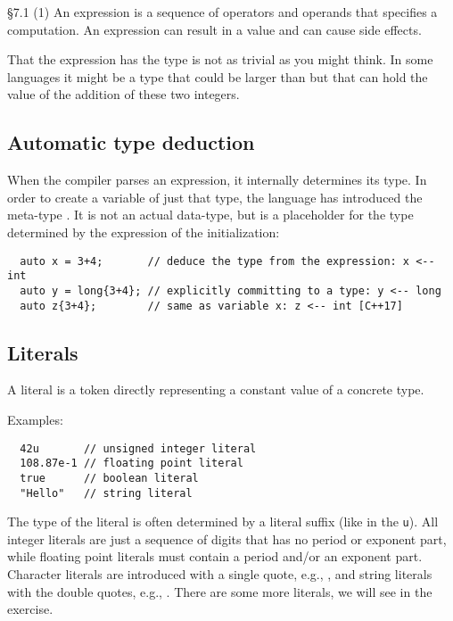\begin{standard}{\S 7.1 (1)}
  An expression is a sequence of operators and operands that specifies a computation. An expression can result in a value and can cause side effects.
\end{standard}

\begin{rem}
  That the expression  has the type  is not as trivial as you might think. In some languages it might be a type that could be larger than  but that can hold the value of the addition of these two integers.
\end{rem}


\subsection{Automatic type deduction}
When the compiler parses an expression, it internally determines its type. In order to create a variable of just that type, the language has introduced the meta-type . It is not an actual data-type, but is a placeholder for the type determined by the expression of the
initialization:
%
\begin{verbatim}
  auto x = 3+4;       // deduce the type from the expression: x <-- int
  auto y = long{3+4}; // explicitly committing to a type: y <-- long
  auto z{3+4};        // same as variable x: z <-- int [C++17]
\end{verbatim}

\subsection{Literals\label{sec:literal}}
A literal is a token directly representing a constant value of a concrete type.

Examples:
\begin{verbatim}
  42u       // unsigned integer literal
  108.87e-1 // floating point literal
  true      // boolean literal
  "Hello"   // string literal
\end{verbatim}

The type of the literal is often determined by a literal suffix (like in  the \texttt{u}). All integer literals are just a sequence of digits that has no period or exponent part, while floating point literals must contain a period and/or an exponent part. Character literals are introduced with a single quote, e.g., , and string literals with the double quotes, e.g., . There are some more literals, we will see in the exercise.

